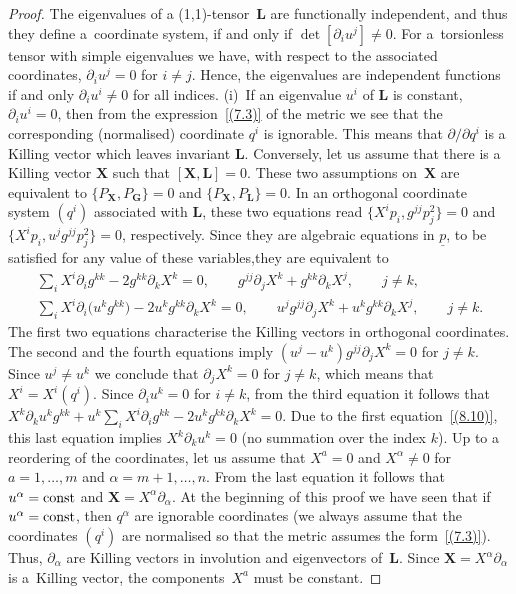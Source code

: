 \documentclass[10pt,a4paper]{amsart}
\def\bs{\boldsymbol}
\numberwithin{equation}{section}
\begin{document}
\begin{proof}
The eigenvalues of a (1,1)-tensor~$\bs L$ are functionally independent, and thus they def\/ine a~coordinate system, if and only if $\det[\partial_iu^j]\neq 0$. For a~torsionless tensor with simple eigenvalues we have, with respect to  the associated coordinates, $\partial_iu^j=0$ for $i\neq j$. Hence, the eigenvalues are independent functions if and only $\partial_iu^i\neq 0$ for all indices. (i)~If an eigenvalue $u^i$ of $\bs L$ is constant, $\partial_iu^i=0$, then from the expression~\eqref{(7.3)} of the metric we see that the corresponding (normalised) coordinate $q^i$ is ignorable. This means that $\partial/\partial q^i$ is a Killing vector which leaves invariant $\bs L$. Conversely, let us assume that there is a Killing vector $\bs X$ such that $[\bs X,\bs L]=0$. These two assumptions on~$\bs X$ are equivalent to $\{P_{\bs X}, P_{\bs G}\}=0$ and $\{P_{\bs X}, P_{\bs L}\}=0$. In an orthogonal coordinate system $(q^i)$ associated with $\bs L$, these two equations read $\{X^ip_i, g^{jj}p_j^2\}=0$ and $\{X^ip_i, u^jg^{jj}p_j^2\}=0$, respectively. Since they are algebraic equations in $\underline p$, to be satisf\/ied for any value of these variables,they are equivalent to
\begin{gather*}
\sum_i X^i\partial_ig^{kk}-2 g^{kk} \partial_kX^k=0,
\qquad
 g^{jj} \partial_jX^k+g^{kk} \partial_kX^j, \qquad j\neq k,
\\
 \sum_i X^i\partial_i\big(u^k g^{kk}\big)-2 u^k g^{kk} \partial_kX^k=0,
\qquad u^j g^{jj} \partial_jX^k+u^k g^{kk} \partial_kX^j, \qquad j\neq k.
\end{gather*}
The f\/irst two equations characterise the Killing vectors in orthogonal coordinates. The second and the fourth equations imply $(u^j-u^k) g^{jj} \partial_jX^k=0$ for $j\neq k$. Since $u^j\neq u^k$ we conclude that $\partial_jX^k=0$ for $j\neq k$, which means that $X^i=X^i(q^i)$. Since $\partial_iu^k=0$ for $i\neq k$, from the third equation it follows that $X^k \partial_ku^k g^{kk}+u^k \sum_iX^i \partial_ig^{kk}-2 u^k g^{kk} \partial_kX^k=0$. Due to the f\/irst equation~\eqref{(8.10)}, this last equation implies $X^k \partial_ku^k=0$ (no summation over the index $k$).
Up to a reordering of the coordinates, let us assume that $X^a=0$ and $X^\alpha\neq 0$ for $a=1,\ldots, m$ and $\alpha=m+1,\ldots, n$. From the last equation it follows that $u^\alpha={\rm const}$ and $\bs X=X^\alpha \partial_\alpha$. At the beginning of this proof we have seen that if $u^\alpha={\rm const}$, then $q^\alpha$ are ignorable coordinates (we always assume that the coordinates $(q^i)$ are normalised so that the metric assumes  the form~\eqref{(7.3)}). Thus, $\partial_\alpha$ are Killing vectors in involution and eigenvectors of~$\bs L$. Since $\bs X=X^\alpha \partial_\alpha$ is a~Killing vector, the components~$X^a$ must be constant.
\end{proof}
\end{document}
